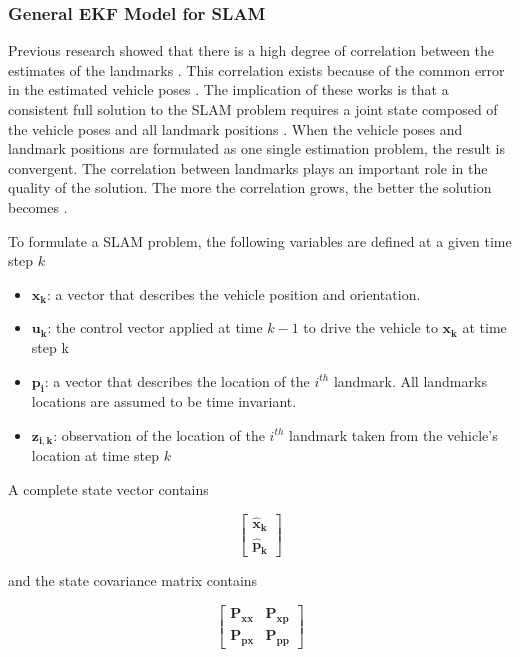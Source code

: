 \subsubsection{General EKF Model for SLAM}
Previous research showed that there is a high degree of correlation
between the estimates of the landmarks
\cite{smith_representation_1986} \cite{durrant-whyte_uncertain_1988}.
This correlation exists because of the common error in the estimated
vehicle poses \cite{leonard_simultaneous_1991}. The implication of
these works is that a consistent full solution to the SLAM problem
requires a joint state composed of the vehicle poses and all landmark
positions \cite{durrant-whyte_simultaneous_2006}. When the vehicle
poses and landmark positions are formulated as one single estimation
problem, the result is convergent. The correlation between landmarks
plays an important role in the quality of the solution. The more the
correlation grows, the better the solution becomes
\cite{durrant-whyte_localization_1996} \cite{csorba_new_1996}
\cite{csorba_simultaneous_1997} \cite{dissanayake_solution_2001}.

To formulate a SLAM problem, the following variables are defined at a given time step $k$
\begin{itemize}
  \item $\boldsymbol{x_k}$: a vector that describes the vehicle position and
orientation.
  \item $\boldsymbol{u_k}$: the control vector applied at time $k-1$ to drive the
vehicle to $\boldsymbol{x_k}$ at time step k
  \item $\boldsymbol{p_i}$: a vector that describes the location of the $i^{th}$
landmark. All landmarks locations are assumed to be time invariant.
  \item $\boldsymbol{z_{i,k}}$: observation of the location of the $i^{th}$
landmark taken from the vehicle's location at time step $k$
\end{itemize}

\noindent A complete state vector contains 

$$\begin{bmatrix}\boldsymbol{\hat{x}_k} \\ \boldsymbol{\hat{p}_k} \end{bmatrix}$$ 

\noindent and the state covariance matrix contains

$$\begin{bmatrix}
\boldsymbol{P_{xx}} & \boldsymbol{P_{xp}} \\
\boldsymbol{P_{px}} & \boldsymbol{P_{pp}} 
\end{bmatrix} $$

